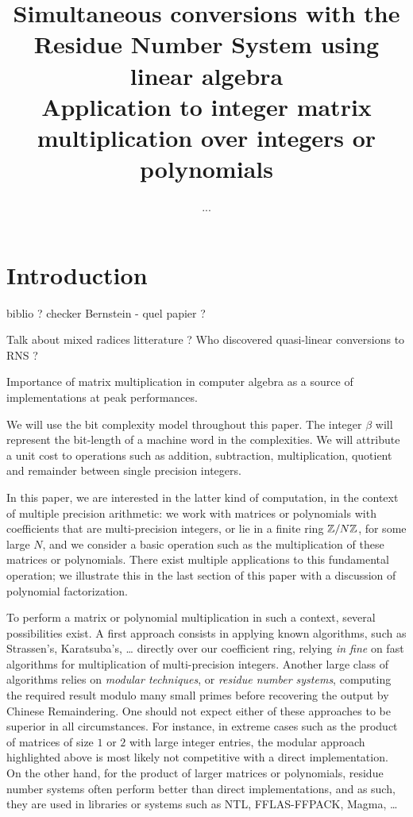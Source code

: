 \documentclass[acmtoms,acmnow]{acmtrans2m}
\title{
Simultaneous conversions with the Residue Number System using linear algebra \\
Application to integer matrix multiplication over integers or polynomials
}
\author{...
}
\begin{document}
            
            
\maketitle

\section{Introduction}
biblio ? checker Bernstein - quel papier ?

Talk about mixed radices litterature ? Who discovered quasi-linear conversions to RNS ?

Importance of matrix multiplication in computer algebra as a source of
implementations at peak performances.

We will use the bit complexity model throughout this paper. The integer $\beta$
will represent the bit-length of a machine word in the complexities. We will
attribute a unit cost to operations such as addition, subtraction,
multiplication, quotient and remainder between single precision integers.

In this paper, we are interested in the latter kind of computation, in the context of multiple
precision arithmetic: we work with matrices or polynomials with coefficients that are
multi-precision integers, or lie in a finite ring $\mathbb{Z}/N\mathbb{Z}$, for some large $N$, and we consider a
basic operation such as the multiplication of these matrices or polynomials. There exist multiple
applications to this fundamental operation; we illustrate this in the last section of this paper
with a discussion of polynomial factorization.

To perform a matrix or polynomial multiplication in such a context, several possibilities exist. A
first approach consists in applying known algorithms, such as Strassen's, Karatsuba's, \dots
directly over our coefficient ring, relying {\it in fine} on fast algorithms for multiplication of
multi-precision integers. Another large class of algorithms relies on {\em modular techniques}, or
{\em residue number systems}, computing the required result modulo many small primes before
recovering the output by Chinese Remaindering.  One should not expect either of these approaches to
be superior in all circumstances. For instance, in extreme cases such as the product of matrices of
size $1$ or $2$ with large integer entries, the modular approach highlighted above is most likely
not competitive with a direct implementation. On the other hand, for the product of larger matrices
or polynomials, residue number systems often perform better than direct implementations, and as
such, they are used in libraries or systems such as NTL, FFLAS-FFPACK, Magma, \dots
\end{document}
